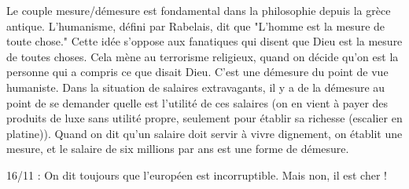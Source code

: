 \documentclass[a4paper,12pt]{book}
\begin{document}
\par Le couple mesure/démesure est fondamental dans la philosophie depuis la grèce antique. L'humanisme, défini par Rabelais, dit que "L'homme est la mesure de toute chose." Cette idée s'oppose aux fanatiques qui disent que Dieu est la mesure de toutes choses. Cela mène au terrorisme religieux, quand on décide qu'on est la personne qui a compris ce que disait Dieu. C'est une démesure du point de vue humaniste. Dans la situation de salaires extravagants, il y a de la démesure au point de se demander quelle est l'utilité de ces salaires (on en vient à payer des produits de luxe sans utilité propre, seulement pour établir sa richesse (escalier en platine)). Quand on dit qu'un salaire doit servir à vivre dignement, on établit une mesure, et le salaire de six millions par ans est une forme de démesure.
\par 16/11 : On dit toujours que l'européen est incorruptible. Mais non, il est cher !
\end{document}
